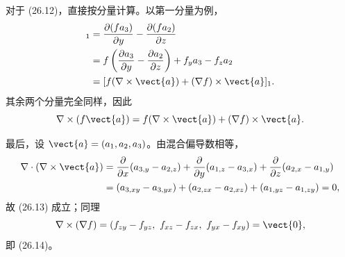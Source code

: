 \begin{xsolution}
对于 (26.12)，直接按分量计算。以第一分量为例，
\begin{align*}
  [\nabla\times(f\vect{a})]_1
  &=\frac{\partial(fa_3)}{\partial y}-\frac{\partial(fa_2)}{\partial z}\\
  &=f\left(\frac{\partial a_3}{\partial y}-\frac{\partial a_2}{\partial z}\right)
   +f_ya_3-f_za_2\\
  &=[f(\nabla\times\vect{a})+(\nabla f)\times\vect{a}]_1.
\end{align*}
其余两个分量完全同样，因此
\[
  \nabla\times(f\vect{a})
  =f(\nabla\times\vect{a})+(\nabla f)\times\vect{a}.
\]

最后，设 $\vect{a}=(a_1,a_2,a_3)$。由混合偏导数相等，
\begin{align*}
  \nabla\cdot(\nabla\times\vect{a})
  ={}&\frac{\partial}{\partial x}(a_{3,y}-a_{2,z})
  +\frac{\partial}{\partial y}(a_{1,z}-a_{3,x})
  +\frac{\partial}{\partial z}(a_{2,x}-a_{1,y})\\
  ={}&(a_{3,xy}-a_{3,yx})+(a_{2,zx}-a_{2,xz})+(a_{1,yz}-a_{1,zy})=0,
\end{align*}
故 (26.13) 成立；同理
\[
  \nabla\times(\nabla f)
  =(f_{zy}-f_{yz},\ f_{xz}-f_{zx},\ f_{yx}-f_{xy})=\vect{0},
\]
即 (26.14)。
\end{xsolution}

